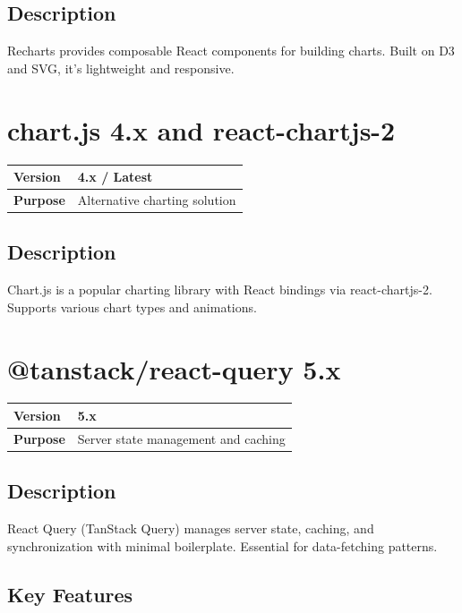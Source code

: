 \documentclass[12pt,a4paper]{report}
\begin{document}
\subsection{Description}

Recharts provides composable React components for building charts. Built on D3 and SVG, it's lightweight and responsive.

\section{chart.js 4.x and react-chartjs-2}

\begin{tabular}{|p{4cm}|p{10cm}|}
\hline
\textbf{Version} & 4.x / Latest \\
\hline
\textbf{Purpose} & Alternative charting solution \\
\hline
\end{tabular}

\subsection{Description}

Chart.js is a popular charting library with React bindings via react-chartjs-2. Supports various chart types and animations.

\section{@tanstack/react-query 5.x}

\begin{tabular}{|p{4cm}|p{10cm}|}
\hline
\textbf{Version} & 5.x \\
\hline
\textbf{Purpose} & Server state management and caching \\
\hline
\end{tabular}

\subsection{Description}

React Query (TanStack Query) manages server state, caching, and synchronization with minimal boilerplate. Essential for data-fetching patterns.

\subsection{Key Features}
\end{document}
